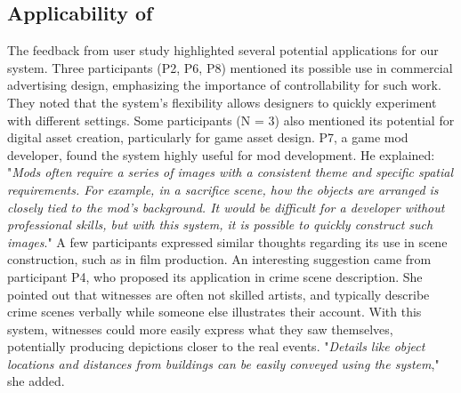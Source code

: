 \subsection{Applicability of \tool}
The feedback from user study highlighted several potential applications for our system. 
Three participants (P2, P6, P8) mentioned its possible use in commercial advertising design, emphasizing the importance of controllability for such work. 
They noted that the system's flexibility allows designers to quickly experiment with different settings.
Some participants (N = 3) also mentioned its potential for digital asset creation, particularly for game asset design. 
P7, a game mod developer, found the system highly useful for mod development. 
He explained: "\emph{Mods often require a series of images with a consistent theme and specific spatial requirements. 
For example, in a sacrifice scene, how the objects are arranged is closely tied to the mod's background. It would be difficult for a developer without professional skills, but with this system, it is possible to quickly construct such images}."
A few participants expressed similar thoughts regarding its use in scene construction, such as in film production. 
An interesting suggestion came from participant P4, who proposed its application in crime scene description. 
She pointed out that witnesses are often not skilled artists, and typically describe crime scenes verbally while someone else illustrates their account. 
With this system, witnesses could more easily express what they saw themselves, potentially producing depictions closer to the real events. "\emph{Details like object locations and distances from buildings can be easily conveyed using the system}," she added.

